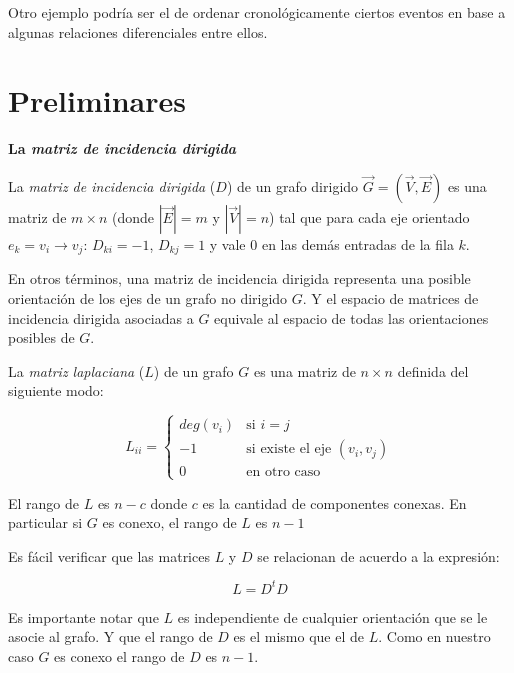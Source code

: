 \documentclass[10pt, a4paper, twocolumn]{article} %
\begin{document}
Otro ejemplo podría ser el de ordenar cronológicamente ciertos eventos 
en base a algunas relaciones diferenciales entre ellos.


\section{Preliminares}

\textbf{La \textit{matriz de incidencia dirigida}}

\smallskip

La \textit{matriz de incidencia dirigida} ($D$) de un grafo dirigido 
$\vec G = (\vec V, \vec E)$ es una matriz de $m \times n$ (donde $|\vec
 E| = m$ y $|\vec V| = n$) tal que para cada eje orientado 
$e_k=v_i \rightarrow v_j$: $D_{ki} = -1$, $D_{kj} = 1$ y vale $0$ en 
las demás entradas de la fila $k$.

\smallskip

En otros términos, una matriz de incidencia dirigida representa una 
posible orientación de los ejes de un grafo no dirigido $G$. Y el 
espacio de matrices de incidencia dirigida asociadas a $G$ 
equivale al espacio de todas las orientaciones posibles de $G$.

\bigskip


La \textit{matriz laplaciana} ($L$) de un grafo $G$ es una matriz de 
$n \times n$ definida del siguiente modo:

$$
	L_{ii} =
	\begin{cases}
	deg(v_i) & \text{si $i = j$} \\
	-1 & \text{si existe el eje $(v_i,v_j)$} \\
	0 & \text{en otro caso} 
	\end{cases}
$$

El rango de $L$ es $n-c$ donde $c$ es la cantidad de componentes 
conexas. En particular si $G$ es conexo, el rango de $L$ es $n-1$

\bigskip


Es fácil verificar que las matrices $L$ y $D$ se relacionan de acuerdo
a la expresión:

$$L = D^t D$$

Es importante notar que $L$ es independiente de cualquier orientación 
que se le asocie al grafo. Y que el rango de $D$ es el mismo que el de 
$L$. Como en nuestro caso $G$ es conexo el rango de $D$ es $n-1$.
\end{document}
